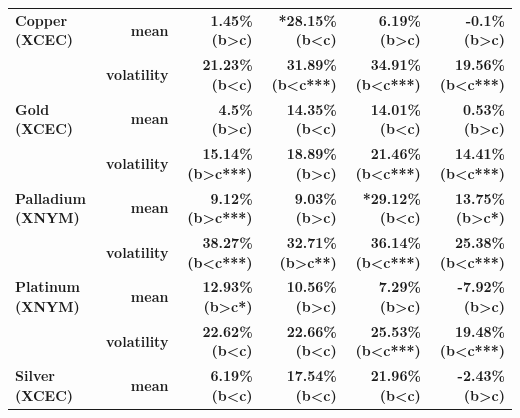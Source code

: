 \documentclass[
  authoryear,
  preprint,
  3p]{elsarticle}
\begin{document}
\begin{longtable}[t]{>{}l>{}r>{}r>{}r>{}r>{}r}
\textbf{Copper (XCEC)} & \textbf{mean} & \textcolor[HTML]{4285f4}{\textbf{1.45\% (b>c)}} & \textcolor[HTML]{4285f4}{\textbf{*28.15\% (b<c)}} & \textcolor[HTML]{4285f4}{\textbf{6.19\% (b>c)}} & \textcolor[HTML]{4285f4}{\textbf{-0.1\% (b>c)}}\\
\textbf{} & \textbf{volatility} & \textcolor[HTML]{4285f4}{\textbf{21.23\% (b<c)}} & \textcolor[HTML]{4285f4}{\textbf{31.89\% (b<c***)}} & \textcolor[HTML]{4285f4}{\textbf{34.91\% (b<c***)}} & \textcolor[HTML]{4285f4}{\textbf{19.56\% (b<c***)}}\\
\addlinespace
\textbf{Gold (XCEC)} & \textbf{mean} & \textcolor[HTML]{4285f4}{\textbf{4.5\% (b>c)}} & \textcolor[HTML]{4285f4}{\textbf{14.35\% (b<c)}} & \textcolor[HTML]{4285f4}{\textbf{14.01\% (b<c)}} & \textcolor[HTML]{4285f4}{\textbf{0.53\% (b>c)}}\\
\textbf{} & \textbf{volatility} & \textcolor[HTML]{4285f4}{\textbf{15.14\% (b>c***)}} & \textcolor[HTML]{4285f4}{\textbf{18.89\% (b>c)}} & \textcolor[HTML]{4285f4}{\textbf{21.46\% (b<c***)}} & \textcolor[HTML]{4285f4}{\textbf{14.41\% (b<c***)}}\\
\textbf{Palladium (XNYM)} & \textbf{mean} & \textcolor[HTML]{4285f4}{\textbf{9.12\% (b>c***)}} & \textcolor[HTML]{4285f4}{\textbf{9.03\% (b>c)}} & \textcolor[HTML]{4285f4}{\textbf{*29.12\% (b<c)}} & \textcolor[HTML]{4285f4}{\textbf{13.75\% (b>c*)}}\\
\textbf{} & \textbf{volatility} & \textcolor[HTML]{4285f4}{\textbf{38.27\% (b<c***)}} & \textcolor[HTML]{4285f4}{\textbf{32.71\% (b>c**)}} & \textcolor[HTML]{4285f4}{\textbf{36.14\% (b<c***)}} & \textcolor[HTML]{4285f4}{\textbf{25.38\% (b<c***)}}\\
\textbf{Platinum (XNYM)} & \textbf{mean} & \textcolor[HTML]{4285f4}{\textbf{12.93\% (b>c*)}} & \textcolor[HTML]{4285f4}{\textbf{10.56\% (b>c)}} & \textcolor[HTML]{4285f4}{\textbf{7.29\% (b>c)}} & \textcolor[HTML]{4285f4}{\textbf{-7.92\% (b>c)}}\\
\addlinespace
\textbf{} & \textbf{volatility} & \textcolor[HTML]{4285f4}{\textbf{22.62\% (b<c)}} & \textcolor[HTML]{4285f4}{\textbf{22.66\% (b<c)}} & \textcolor[HTML]{4285f4}{\textbf{25.53\% (b<c***)}} & \textcolor[HTML]{4285f4}{\textbf{19.48\% (b<c***)}}\\
\textbf{Silver (XCEC)} & \textbf{mean} & \textcolor[HTML]{4285f4}{\textbf{6.19\% (b<c)}} & \textcolor[HTML]{4285f4}{\textbf{17.54\% (b<c)}} & \textcolor[HTML]{4285f4}{\textbf{21.96\% (b<c)}} & \textcolor[HTML]{4285f4}{\textbf{-2.43\% (b>c)}}\\

\end{longtable}
\end{document}
